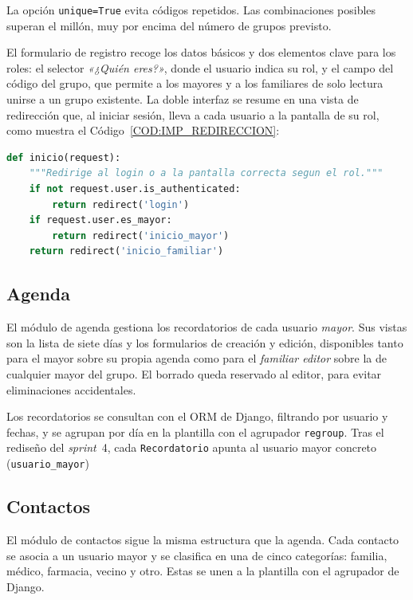 La opción \texttt{unique=True} evita códigos repetidos. Las combinaciones
posibles superan el millón, muy por encima del número de grupos previsto.

El formulario de registro recoge los datos básicos y dos elementos clave
para los roles: el selector \emph{«¿Quién eres?»}, donde el usuario indica
su rol, y el campo del código del grupo, que permite a los mayores y a los
familiares de solo lectura unirse a un grupo existente.
La doble interfaz se resume en una vista de redirección que, al
iniciar sesión, lleva a cada usuario a la pantalla de su rol, como muestra
el Código~\ref{COD:IMP_REDIRECCION}:

\begin{lstlisting}[language=Python, caption={Redirección a la
pantalla principal según el rol del usuario.},
label={COD:IMP_REDIRECCION}]
def inicio(request):
    """Redirige al login o a la pantalla correcta segun el rol."""
    if not request.user.is_authenticated:
        return redirect('login')
    if request.user.es_mayor:
        return redirect('inicio_mayor')
    return redirect('inicio_familiar')
\end{lstlisting}


\subsection{Agenda\label{SUB:IMP_AGENDA}}

El módulo de agenda gestiona los recordatorios de cada usuario \emph{mayor}.
Sus vistas son la lista de siete días y los formularios de creación y
edición, disponibles tanto para el mayor sobre su propia agenda como para
el \emph{familiar editor} sobre la de cualquier mayor del grupo. El borrado
queda reservado al editor, para evitar eliminaciones accidentales.

Los recordatorios se consultan con el ORM de Django, filtrando por usuario
y fechas, y se agrupan por día en la plantilla con el agrupador
\texttt{regroup}. Tras el rediseño del \emph{sprint}~4, cada
\texttt{Recordatorio} apunta al usuario mayor concreto (\texttt{usuario\_mayor})

\subsection{Contactos\label{SUB:IMP_CONTACTOS}}

El módulo de contactos sigue la misma estructura que la agenda. Cada
contacto se asocia a un usuario mayor y se clasifica en una de cinco
categorías: familia, médico, farmacia, vecino y otro. Estas se unen a la
plantilla con el agrupador de Django.

